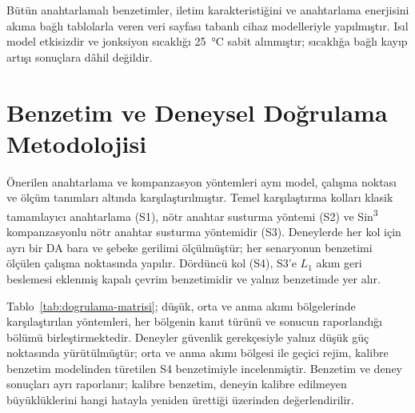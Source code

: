 Bütün anahtarlamalı benzetimler, iletim karakteristiğini ve anahtarlama enerjisini akıma bağlı tablolarla veren veri sayfası tabanlı cihaz modelleriyle yapılmıştır. Isıl model etkisizdir ve jonksiyon sıcaklığı \SI{25}{\celsius} sabit alınmıştır; sıcaklığa bağlı kayıp artışı sonuçlara dâhil değildir.

\section{Benzetim ve Deneysel Doğrulama Metodolojisi}
\label{sec:dogrulama-metodolojisi}

Önerilen anahtarlama ve kompanzasyon yöntemleri aynı model, çalışma noktası ve ölçüm tanımları altında karşılaştırılmıştır. Temel karşılaştırma kolları klasik tamamlayıcı anahtarlama (S1), nötr anahtar susturma yöntemi (S2) ve Sin\textsuperscript{3} kompanzasyonlu nötr anahtar susturma yöntemidir (S3). Deneylerde her kol için ayrı bir DA bara ve şebeke gerilimi ölçülmüştür; her senaryonun benzetimi ölçülen çalışma noktasında yapılır. Dördüncü kol (S4), S3'e $L_1$ akım geri beslemesi eklenmiş kapalı çevrim benzetimidir ve yalnız benzetimde yer alır.

Tablo~\ref{tab:dogrulama-matrisi}; düşük, orta ve anma akımı bölgelerinde karşılaştırılan yöntemleri, her bölgenin kanıt türünü ve sonucun raporlandığı bölümü birleştirmektedir. Deneyler güvenlik gerekçesiyle yalnız düşük güç noktasında yürütülmüştür; orta ve anma akımı bölgesi ile geçici rejim, kalibre benzetim modelinden türetilen S4 benzetimiyle incelenmiştir. Benzetim ve deney sonuçları ayrı raporlanır; kalibre benzetim, deneyin kalibre edilmeyen büyüklüklerini hangi hatayla yeniden ürettiği üzerinden değerlendirilir.

